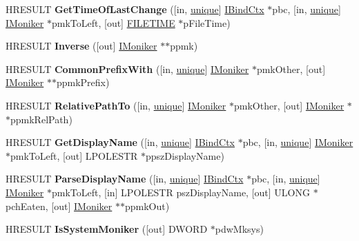 \begin{DoxyCompactItemize}
\item 
\mbox{\label{interface_i_moniker_a3dedbb42a2c7a2061511129f0ed57f3f}} 
H\+R\+E\+S\+U\+LT {\bfseries Get\+Time\+Of\+Last\+Change} (\mbox{[}in, \hyperlink{interfaceunique}{unique}\mbox{]} \hyperlink{interface_i_bind_ctx}{I\+Bind\+Ctx} $\ast$pbc, \mbox{[}in, \hyperlink{interfaceunique}{unique}\mbox{]} \hyperlink{interface_i_moniker}{I\+Moniker} $\ast$pmk\+To\+Left, \mbox{[}out\mbox{]} \hyperlink{struct___f_i_l_e_t_i_m_e}{F\+I\+L\+E\+T\+I\+ME} $\ast$p\+File\+Time)
\item 
\mbox{\label{interface_i_moniker_a966f58924f1431d9c3cb783dff637a6d}} 
H\+R\+E\+S\+U\+LT {\bfseries Inverse} (\mbox{[}out\mbox{]} \hyperlink{interface_i_moniker}{I\+Moniker} $\ast$$\ast$ppmk)
\item 
\mbox{\label{interface_i_moniker_a0293b77bf5588d19aebbd2f6222e0f4c}} 
H\+R\+E\+S\+U\+LT {\bfseries Common\+Prefix\+With} (\mbox{[}in, \hyperlink{interfaceunique}{unique}\mbox{]} \hyperlink{interface_i_moniker}{I\+Moniker} $\ast$pmk\+Other, \mbox{[}out\mbox{]} \hyperlink{interface_i_moniker}{I\+Moniker} $\ast$$\ast$ppmk\+Prefix)
\item 
\mbox{\label{interface_i_moniker_ad6688f9a72b6ce2dc182b8bae8d41dad}} 
H\+R\+E\+S\+U\+LT {\bfseries Relative\+Path\+To} (\mbox{[}in, \hyperlink{interfaceunique}{unique}\mbox{]} \hyperlink{interface_i_moniker}{I\+Moniker} $\ast$pmk\+Other, \mbox{[}out\mbox{]} \hyperlink{interface_i_moniker}{I\+Moniker} $\ast$$\ast$ppmk\+Rel\+Path)
\item 
\mbox{\label{interface_i_moniker_a799d1eb85554a06431add7b2cf5e269c}} 
H\+R\+E\+S\+U\+LT {\bfseries Get\+Display\+Name} (\mbox{[}in, \hyperlink{interfaceunique}{unique}\mbox{]} \hyperlink{interface_i_bind_ctx}{I\+Bind\+Ctx} $\ast$pbc, \mbox{[}in, \hyperlink{interfaceunique}{unique}\mbox{]} \hyperlink{interface_i_moniker}{I\+Moniker} $\ast$pmk\+To\+Left, \mbox{[}out\mbox{]} L\+P\+O\+L\+E\+S\+TR $\ast$ppsz\+Display\+Name)
\item 
\mbox{\label{interface_i_moniker_ada8b728fca8b65b3f5d74a2984831e83}} 
H\+R\+E\+S\+U\+LT {\bfseries Parse\+Display\+Name} (\mbox{[}in, \hyperlink{interfaceunique}{unique}\mbox{]} \hyperlink{interface_i_bind_ctx}{I\+Bind\+Ctx} $\ast$pbc, \mbox{[}in, \hyperlink{interfaceunique}{unique}\mbox{]} \hyperlink{interface_i_moniker}{I\+Moniker} $\ast$pmk\+To\+Left, \mbox{[}in\mbox{]} L\+P\+O\+L\+E\+S\+TR psz\+Display\+Name, \mbox{[}out\mbox{]} U\+L\+O\+NG $\ast$pch\+Eaten, \mbox{[}out\mbox{]} \hyperlink{interface_i_moniker}{I\+Moniker} $\ast$$\ast$ppmk\+Out)
\item 
\mbox{\label{interface_i_moniker_a625d1e18ab485a291bf2ed45123c3cdd}} 
H\+R\+E\+S\+U\+LT {\bfseries Is\+System\+Moniker} (\mbox{[}out\mbox{]} D\+W\+O\+RD $\ast$pdw\+Mksys)
\end{DoxyCompactItemize}



